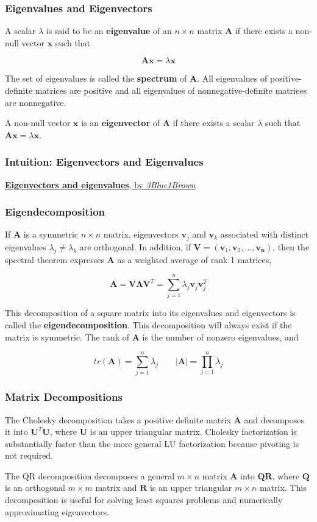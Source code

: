 \documentclass{beamer}
\begin{document}
\begin{frame}
\frametitle{Eigenvalues and Eigenvectors}
A scalar $\lambda$ is said to be an \textbf{eigenvalue} of an $n \times n$ matrix $\mathbf{A}$ if there exists a non-null vector $\mathbf{x}$ such that

\[\mathbf{Ax} = \lambda\mathbf{x}\]

The set of eigenvalues is called the \textbf{spectrum} of $\mathbf{A}$.  All eigenvalues of positive-definite matrices are positive and all eigenvalues of nonnegative-definite matrices are nonnegative. 
\vspace{5mm}

 A non-null vector $\mathbf{x}$ is an \textbf{eigenvector} of $\mathbf{A}$ if there exists a scalar $\lambda$ such that $\mathbf{Ax} = \lambda\mathbf{x}$.
\end{frame}

 \begin{frame}
\frametitle{Intuition: Eigenvectors and Eigenvalues}

\href{https://www.youtube.com/watch?v=PFDu9oVAE-g&index=13&list=PLZHQObOWTQDPD3MizzM2xVFitgF8hE_ab}{\textbf{Eigenvectors and eigenvalues}, by \textit{3Blue1Brown}}
\end{frame}

\begin{frame}
\frametitle{Eigendecomposition}
If  $\mathbf{A}$ is a symmetric $n \times n$ matrix, eigenvectors $\mathbf{v}_j$ and $\mathbf{v}_k$ associated with distinct eigenvalues $\lambda_j \neq \lambda_k$ are orthogonal.  In addition, if $\mathbf{V} = (\mathbf{v}_1, \mathbf{v}_2, \hdots, \mathbf{v_n})$, then the spectral theorem expresses $\mathbf{A}$ as a weighted average of rank 1 matrices,

\[\mathbf{A} = \mathbf{V\Lambda V}^T = \sum_{j=1}^n \lambda_j \mathbf{v}_j \mathbf{v}_j ^T\]

This decomposition of a square matrix into its eigenvalues and eigenvectors is called the \textbf{eigendecomposition}.  This decomposition will always exist if the matrix is symmetric.  The rank of $\mathbf{A}$ is the number of nonzero eigenvalues, and

\[tr(\mathbf{A}) = \sum_{j = 1}^n \lambda_j \qquad |\mathbf{A}| = \prod_{j=1}^n \lambda_j \]

\end{frame}

\begin{frame}
\frametitle{Matrix Decompositions}
The Cholesky decomposition takes a positive definite matrix $\mathbf{A}$ and decomposes it into $\mathbf{U}^T\mathbf{U}$, where $\mathbf{U}$ is an upper triangular matrix.  Cholesky factorization is substantially faster than the more general LU factorization because pivoting is not required.  

\vspace{5mm}

The QR decomposition decomposes a general $m \times n$ matrix $\mathbf{A}$ into $\mathbf{QR}$, where $\mathbf{Q}$ is an orthogonal $m \times m$ matrix and $\mathbf{R}$ is an upper triangular $m \times n$ matrix.  This decomposition is useful for solving least squares problems and numerically approximating eigenvectors. 
\end{frame}
\end{document}
